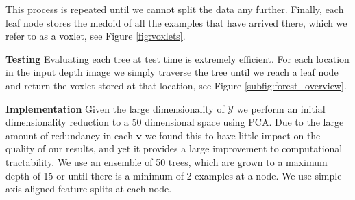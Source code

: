 \documentclass[10pt,twocolumn,letterpaper]{article}
\renewcommand{\paragraph}{\vspace{2pt}\noindent\textbf}
\begin{document}
This process is repeated until we cannot split the data any further.
Finally, each leaf node stores the medoid of all the examples that have arrived there, which we refer to as a voxlet, see Figure \ref{fig:voxlets}.


\paragraph{Testing}
Evaluating each tree at test time is extremely efficient.
For each location in the input depth image we simply traverse the tree until we reach a leaf node and return the voxlet stored at that location, see Figure \ref{subfig:forest_overview}.

\paragraph{Implementation}
Given the large dimensionality of $\mathcal{Y}$ we perform an initial dimensionality reduction to a 50 dimensional space using PCA.
Due to the large amount of redundancy in each $\mathbf{v}$ we found this to have little impact on the quality of our results, and yet it provides a large improvement to computational tractability.
We use an ensemble of 50 trees, which are grown to a maximum depth of 15 or until there is a minimum of 2 examples at a node.
We use simple axis aligned feature splits at each node.
\end{document}

